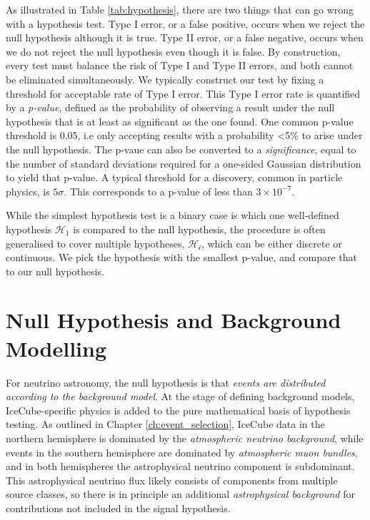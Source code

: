 As illustrated in Table \ref{tab:hypothesis}, there are two things that can go wrong with a hypothesis test. Type I error, or a false positive, occurs when we reject the null hypothesis although it is true. Type II error, or a false negative, occurs when we do not reject the null hypothesis even though it is false. By construction, every test must balance the risk of Type I and Type II errors, and both cannot be eliminated simultaneously. We typically construct our test by fixing a threshold for acceptable rate of Type I error. This Type I error rate is quantified by a \emph{p-value}, defined as the probability of observing a result under the null hypothesis that is at least as significant as the one found. One common p-value threshold is 0.05, i.e only accepting results with a probability <5\% to arise under the null hypothesis. The p-vaue can also be converted to a \emph{significance}, equal to the number of standard deviations required for a one-sided Gaussian distribution to yield that p-value. A typical threshold for a discovery, common in particle physics, is $5 \sigma$. This corresponds to a p-value of less than $3 \times 10^{-7}$.

While the simplest hypothesis test is a binary case is which one well-defined hypothesis $\mathcal{H_{1}}$ is compared to the null hypothesis, the procedure is often generalised to cover multiple hypotheses, $\mathcal{H_{i}}$, which can be either discrete or continuous. We pick the hypothesis with the smallest p-value, and compare that to our null hypothesis.

\section{Null Hypothesis and Background Modelling}
\label{sec:background}

For neutrino astronomy, the null hypothesis is that \emph{events are distributed according to the background model}. At the stage of defining background models, IceCube-specific physics is added to the pure mathematical basis of hypothesis testing. As outlined in Chapter \ref{ch:event_selection}, IceCube data in the northern hemisphere is dominated by the \emph{atmospheric neutrino background}, while events in the southern hemisphere are dominated by \emph{atmospheric muon bundles}, and in both hemispheres the astrophysical neutrino component is subdominant. This astrophysical neutrino flux likely consists of components from multiple source classes, so there is in principle an additional \emph{astrophysical background} for contributions not included in the signal hypothesis.

